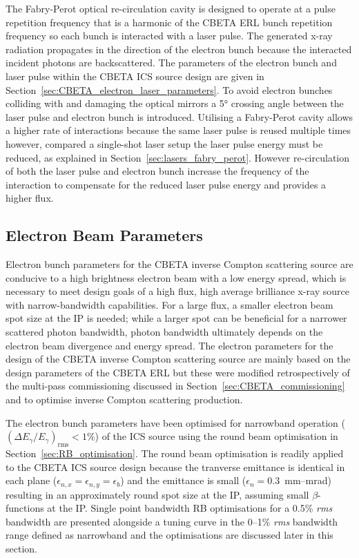 \documentclass[../main.tex]{subfiles}
\begin{document}
The Fabry-Perot optical re-circulation cavity is designed to operate at a pulse repetition frequency that is a harmonic of the CBETA ERL bunch repetition frequency so each bunch is interacted with a laser pulse. The generated x-ray radiation propagates in the direction of the electron bunch because the interacted incident photons are backscattered. The parameters of the electron bunch and laser pulse within the CBETA ICS source design are given in Section~\ref{sec:CBETA_electron_laser_parameters}. To avoid electron bunches colliding with and damaging the optical mirrors \cite{variola2011luminosity} a 5\si{\degree} crossing angle between the laser pulse and electron bunch is introduced. Utilising a Fabry-Perot cavity allows a higher rate of interactions because the same laser pulse is reused multiple times however, compared  a single-shot laser setup the laser pulse energy must be reduced, as explained in Section~\ref{sec:lasers_fabry_perot}. However re-circulation of both the laser pulse and electron bunch increase the frequency of the interaction to compensate for the reduced laser pulse energy and provides a higher flux.

\subsection{Electron Beam Parameters}
\label{sec:CBETA_ICS_electron_parameters}

Electron bunch parameters for the CBETA inverse Compton scattering source are conducive to a high brightness electron beam with a low energy spread, which is necessary to meet design goals of a high flux, high average brilliance x-ray source with narrow-bandwidth capabilities. For a large flux, a smaller electron beam spot size at the IP is needed; while a larger spot can be beneficial for a narrower scattered photon bandwidth, photon bandwidth ultimately depends on the electron beam divergence and energy spread. The electron parameters for the design of the CBETA inverse Compton scattering source are mainly based on the design parameters of the CBETA ERL \cite{hoffstaetter2017cbeta} but these were modified retrospectively of the multi-pass commissioning \cite{bartnik2020cbeta} discussed in  Section~\ref{sec:CBETA_commissioning} and to optimise inverse Compton scattering production. 

The electron bunch parameters have been optimised for narrowband operation ($\left(\Delta E_{\gamma}/E_{\gamma}\right)_{\mathrm{rms}} < 1\%$) of the ICS source using the round beam optimisation in Section~\ref{sec:RB_optimisation}. The round beam optimisation is readily applied to the CBETA ICS source design because the tranverse emittance is identical in each plane ($\epsilon_{n,x}=\epsilon_{n,y}=\epsilon_{b}$) and the emittance is small ($\epsilon_{n}=0.3$~\si{\milli\meter}--\si{\milli\radian}) resulting in an approximately round spot size at the IP, assuming small $\beta$-functions at the IP. Single point bandwidth RB optimisations for a 0.5\% \textit{rms} bandwidth are presented alongside a tuning curve in the 0--1\% \textit{rms} bandwidth range defined as narrowband and the optimisations are discussed later in this section. 
\end{document}

